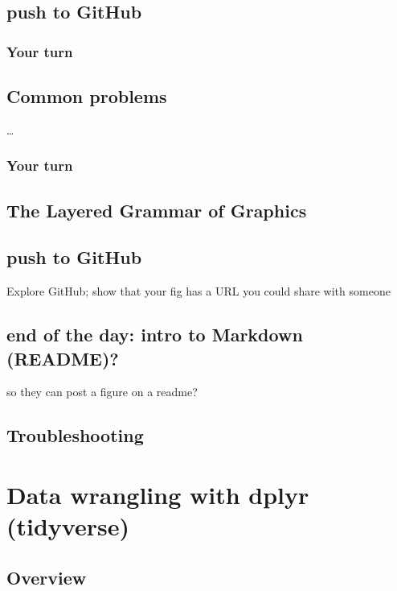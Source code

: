 \documentclass[]{book}
\theoremstyle{definition}
\theoremstyle{definition}
\theoremstyle{definition}
\theoremstyle{remark}
\begin{document}
\section{push to GitHub}\label{push-to-github}

\subsection{Your turn}\label{your-turn-4}

\section{Common problems}\label{common-problems}

\ldots{}

\subsection{Your turn}\label{your-turn-5}

\section{The Layered Grammar of
Graphics}\label{the-layered-grammar-of-graphics}

\section{push to GitHub}\label{push-to-github-1}

Explore GitHub; show that your fig has a URL you could share with
someone

\section{end of the day: intro to Markdown
(README)?}\label{end-of-the-day-intro-to-markdown-readme}

so they can post a figure on a readme?

\section{Troubleshooting}\label{troubleshooting-2}

\chapter{Data wrangling with dplyr (tidyverse)}\label{dplyr}

\section{Overview}\label{overview}
\end{document}
